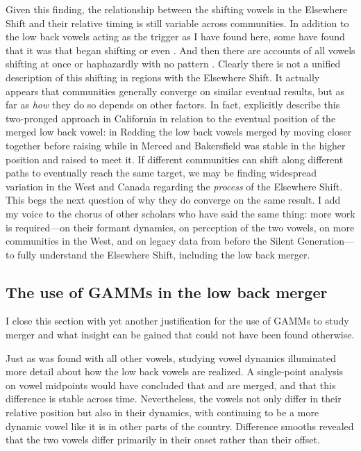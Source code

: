 Given this finding, the relationship between the shifting vowels in the Elsewhere Shift and their relative timing is still variable across communities. In addition to the low back vowels acting as the trigger as I have found here, some have found that it was \bat that began shifting \citep{kennedy_grama_2012, becker_etal_2016_pads} or even \dress \citep{holland_2014_diss}. And then there are accounts of all vowels shifting at once \citep{boberg_2005, lawrance_2002_thesis, donofrio_etal_2019} or haphazardly with no pattern \citep{pratt_etal_2018}. Clearly there is not a unified description of this shifting in regions with the Elsewhere Shift. It actually appears that communities generally converge on similar eventual results, but as far as \textit{how} they do so depends on other factors. In fact, \citet[23--25]{donofrio_etal_2017_pads} explicitly describe this two-pronged approach in California in relation to the eventual position of the merged low back vowel: in Redding the low back vowels merged by moving closer together before raising while in Merced and Bakersfield \thought was stable in the higher position and \lot raised to meet it. If different communities can shift along different paths to eventually reach the same target, we may be finding widespread variation in the West and Canada regarding the \textit{process} of the Elsewhere Shift. This begs the next question of why they do converge on the same result. I add my voice to the chorus of other scholars who have said the same thing: more work is required---on their formant dynamics, on perception of the two vowels, on more communities in the West, and on legacy data from before the Silent Generation---to fully understand the Elsewhere Shift, including the low back merger.

\subsection{The use of GAMMs in the low back merger}

I close this section with yet another justification for the use of GAMMs to study merger and what insight can be gained that could not have been found otherwise.

Just as was found with all other vowels, studying vowel dynamics illuminated more detail about how the low back vowels are realized. A single-point analysis on vowel midpoints would have concluded that \lot and \thought are merged, and that this difference is stable across time. Nevertheless, the vowels not only differ in their relative position but also in their dynamics, with \thought continuing to be a more dynamic vowel like it is in other parts of the country. Difference smooths revealed that the two vowels differ primarily in their onset rather than their offset.

